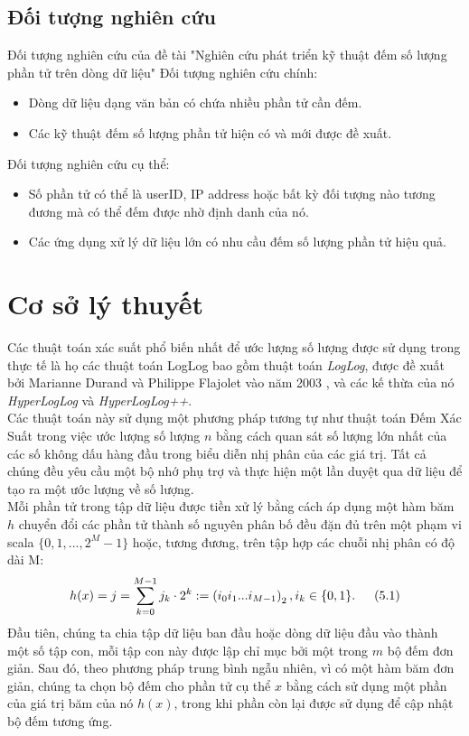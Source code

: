 \documentclass[letterpaper,13pt]{article}
\theoremstyle{mytheor}
\begin{document}
\subsection{Đối tượng nghiên cứu }
Đối tượng nghiên cứu của đề tài "Nghiên cứu phát triển kỹ thuật đếm số lượng phần tử trên dòng dữ liệu"
Đối tượng nghiên cứu chính:
\begin{itemize}
    \item Dòng dữ liệu dạng văn bản có chứa nhiều phần tử cần đếm.
    \item Các kỹ thuật đếm số lượng phần tử hiện có và mới được đề xuất.
\end{itemize}
Đối tượng nghiên cứu cụ thể:
\begin{itemize}
    \item Số phần tử có thể là userID, IP address hoặc bất kỳ đối tượng nào tương đương mà có thể đếm được nhờ định danh của nó.
    \item Các ứng dụng xử lý dữ liệu lớn có nhu cầu đếm số lượng phần tử hiệu quả.
\end{itemize}

\section{Cơ sở lý thuyết}
Các thuật toán xác suất phổ biến nhất để ước lượng số lượng được sử dụng trong thực tế là họ các thuật toán LogLog bao gồm thuật toán \textit{LogLog}, 
được đề xuất bởi Marianne Durand và Philippe Flajolet vào năm 2003 \cite{durand2003loglog}, và các kế thừa của nó \textit{HyperLogLog} và \textit{HyperLogLog++}.\\
Các thuật toán này sử dụng một phương pháp tương tự như thuật toán Đếm Xác Suất trong việc ước lượng số lượng $n$ bằng cách quan sát số lượng lớn nhất 
của các số không dấu hàng đầu trong biểu diễn nhị phân của các giá trị. Tất cả chúng đều yêu cầu một bộ nhớ phụ trợ và thực hiện một lần duyệt qua dữ liệu 
để tạo ra một ước lượng về số lượng.\\

Mỗi phần tử trong tập dữ liệu được tiền xử lý bằng cách áp dụng một hàm băm $h$ chuyển đổi các phần tử thành số nguyên phân bố đều đặn đủ 
trên một phạm vi scala $\{0,1,...,2^M-1\}$ hoặc, tương đương, trên tập hợp các chuỗi nhị phân có độ dài M:
\[
    h(x) = j = \sum\limits_{k=0}^{M-1}j_k\cdot2^k := \left(i_0i_1...i_{M-1}\right)_2,i_k \in \{0,1\}. \indent (5.1)   
\]
\indent Đầu tiên, chúng ta chia tập dữ liệu ban đầu hoặc dòng dữ liệu đầu vào thành một số tập con, mỗi tập con này được lập chỉ mục bởi một trong $m$ bộ đếm đơn giản. 
Sau đó, theo phương pháp trung bình ngẫu nhiên, vì có một hàm băm đơn giản, chúng ta chọn bộ đếm cho phần tử cụ thể $x$ bằng cách sử dụng một phần của 
giá trị băm của nó $h(x)$, trong khi phần còn lại được sử dụng để cập nhật bộ đếm tương ứng.\\
\end{document}
